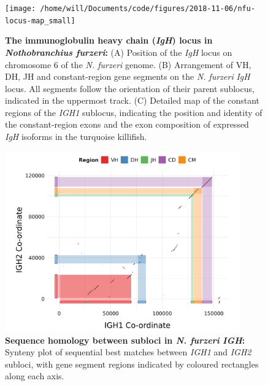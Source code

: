 	
	\begin{figure}
	\centering
	\texttt{[image: /home/will/Documents/code/figures/2018-11-06/nfu-locus-map\_small]} %
			    \begin{subfigure}{0em}
        \label{fig:nfu-locus-map-a}
    \end{subfigure}
    \begin{subfigure}{0em}
        \label{fig:nfu-locus-map-b}
    \end{subfigure}
    \begin{subfigure}{0em}
        \label{fig:nfu-locus-map-c}
        \end{subfigure}
	\caption[The immunoglobulin heavy chain (\textit{IGH}) locus in \textit{Nothobranchius furzeri}]{\textbf{The immunoglobulin heavy chain (\textit{IgH}) locus in \textit{Nothobranchius furzeri}:} (A) Position of the \textit{IgH} locus on chromosome 6 of the \textit{N. furzeri} genome. (B) Arrangement of VH, DH, JH and constant-region gene segments on the \textit{N. furzeri} \textit{IgH} locus. All segments follow the orientation of their parent sublocus, indicated in the uppermost track. (C) Detailed map of the constant regions of the \textit{IGH1} sublocus, indicating the position and identity of the constant-region exons and the exon composition of expressed \textit{IgH} isoforms in the turquoise killifish.}
	\label{fig:nfu-locus-map}
	\end{figure}
	
	\begin{figure}
	\centering
	\includegraphics[width=0.9\textwidth]{_Figures/png/nfu-locus-dots.png}
	\caption[Sequence homology between subloci in \textit{N. furzeri} \textit{IGH}]{\textbf{Sequence homology between subloci in \textit{N. furzeri} \textit{IGH}:} Synteny plot of sequential best matches between \textit{IGH1} and \textit{IGH2} subloci, with gene segment regions indicated by coloured rectangles along each axis.}
	\label{fig:nfu-locus-synteny}
	\end{figure}
	

